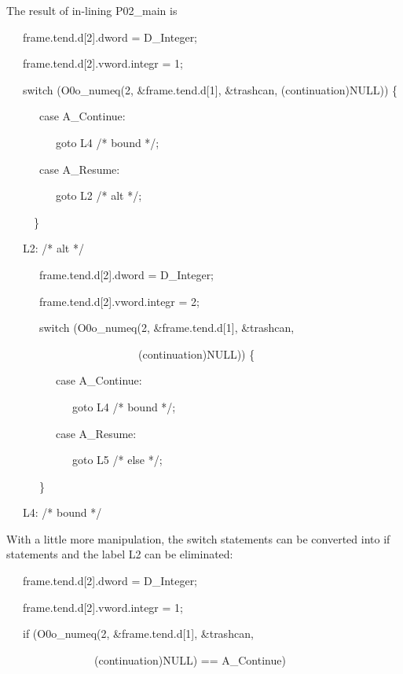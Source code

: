 The result of in-lining P02\_main is 

{\ttfamily\mdseries
\ \ \ frame.tend.d[2].dword = D\_Integer;}

{\ttfamily\mdseries
\ \ \ frame.tend.d[2].vword.integr = 1;}

{\ttfamily\mdseries
\ \ \ switch (O0o\_numeq(2, \&frame.tend.d[1], \&trashcan, (continuation)NULL)) \{}

{\ttfamily\mdseries
\ \ \ \ \ \ case A\_Continue:}

{\ttfamily\mdseries
\ \ \ \ \ \ \ \ \ goto L4 /* bound */;}

{\ttfamily\mdseries
\ \ \ \ \ \ case A\_Resume:}

{\ttfamily\mdseries
\ \ \ \ \ \ \ \ \ goto L2 /* alt */;}

{\ttfamily\mdseries
\ \ \ \ \ \}}

{\ttfamily\mdseries
\ \ \ L2: /* alt */}

{\ttfamily\mdseries
\ \ \ \ \ \ frame.tend.d[2].dword = D\_Integer;}

{\ttfamily\mdseries
\ \ \ \ \ \ frame.tend.d[2].vword.integr = 2;}

{\ttfamily\mdseries
\ \ \ \ \ \ switch (O0o\_numeq(2, \&frame.tend.d[1], \&trashcan,}

{\ttfamily\mdseries
\ \ \ \ \ \ \ \ \ \ \ \ \ \ \ \ \ \ \ \ \ \ \ \ (continuation)NULL)) \{}

{\ttfamily\mdseries
\ \ \ \ \ \ \ \ \ case A\_Continue:}

{\ttfamily\mdseries
\ \ \ \ \ \ \ \ \ \ \ \ goto L4 /* bound */;}

{\ttfamily\mdseries
\ \ \ \ \ \ \ \ \ case A\_Resume:}

{\ttfamily\mdseries
\ \ \ \ \ \ \ \ \ \ \ \ goto L5 /* else */;}

{\ttfamily\mdseries
\ \ \ \ \ \ \}}

{\ttfamily\mdseries
\ \ \ L4: /* bound */}


With a little more manipulation, the switch statements can be
converted into if statements and the label L2 can be eliminated:

{\ttfamily\mdseries
\ \ \ frame.tend.d[2].dword = D\_Integer;}

{\ttfamily\mdseries
\ \ \ frame.tend.d[2].vword.integr = 1;}

{\ttfamily\mdseries
\ \ \ if (O0o\_numeq(2, \&frame.tend.d[1], \&trashcan,}

{\ttfamily\mdseries
\ \ \ \ \ \ \ \ \ \ \ \ \ \ \ \ (continuation)NULL) == A\_Continue)}

